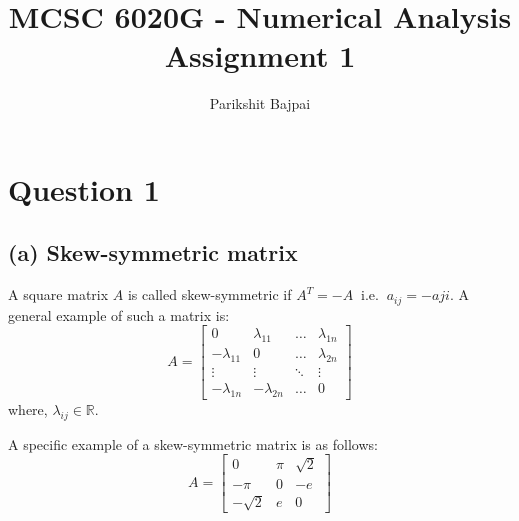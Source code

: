\documentclass[11pt, oneside]{article}
\title{MCSC 6020G - Numerical Analysis \\
        \Large Assignment 1}
\author{Parikshit Bajpai}
\date{}
\begin{document}
\maketitle

\section*{Question 1}
\subsection*{(a) Skew-symmetric matrix}
  A square matrix $A$ is called skew-symmetric if $A^T = -A \;\; \text{i.e.} \;\; a_{ij}=-a{ji}$. A general example of such a matrix is:
  \begin{equation*}
      A=
      \begin{bmatrix}
        0              & \lambda_{11}  & \dots   & \lambda_{1n} \\
        -\lambda_{11}  & 0             & \dots   & \lambda_{2n} \\
        \vdots         & \vdots        & \ddots  & \vdots \\
        -\lambda_{1n}  & -\lambda_{2n} & \dots   & 0
      \end{bmatrix}
  \end{equation*}
  where, $\lambda_{ij} \in \mathbb{R}$.

  A specific example of a skew-symmetric matrix is as follows:
  \begin{equation*}
    A=
    \begin{bmatrix}
      0              & \pi        & \sqrt{2} \\
      -\pi           & 0          & -e \\
      -\sqrt{2}      & e          & 0
    \end{bmatrix}
  \end{equation*}
\end{document}
